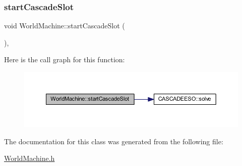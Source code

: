 \subsubsection{\texorpdfstring{start\+Cascade\+Slot}{startCascadeSlot}}
{\footnotesize\ttfamily void World\+Machine\+::start\+Cascade\+Slot (\begin{DoxyParamCaption}{ }\end{DoxyParamCaption})\hspace{0.3cm}{\ttfamily [inline]}, {\ttfamily [slot]}}

Here is the call graph for this function\+:\nopagebreak
\begin{figure}[H]
\begin{center}
\leavevmode
\includegraphics[width=350pt]{class_world_machine_aa59dea1c70b3767e42a624daba7497b9_cgraph}
\end{center}
\end{figure}


The documentation for this class was generated from the following file\+:\begin{DoxyCompactItemize}
\item 
\mbox{\hyperlink{_world_machine_8h}{World\+Machine.\+h}}\end{DoxyCompactItemize}
